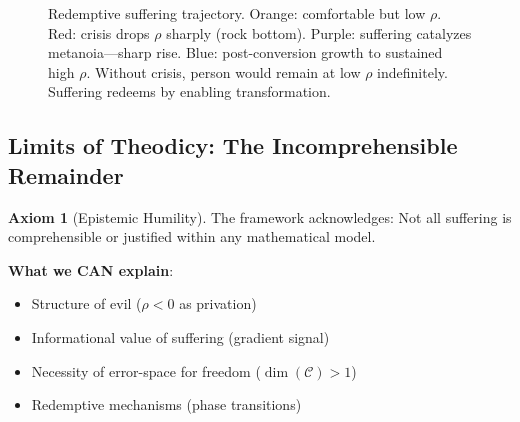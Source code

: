 \documentclass[11pt,a4paper]{article}
\theoremstyle{definition}
\newtheorem{axiom}{Axiom}[section]
\theoremstyle{remark}
\newcommand{\CC}{\mathcal{C}}
\begin{document}
\begin{small}
\begin{enumerate}
\begin{figure}[H]
\caption{Redemptive suffering trajectory. Orange: comfortable but low \(\rho\). Red: crisis drops \(\rho\) sharply (rock bottom). Purple: suffering catalyzes metanoia—sharp rise. Blue: post-conversion growth to sustained high \(\rho\). Without crisis, person would remain at low \(\rho\) indefinitely. Suffering redeems by enabling transformation.}
\label{fig:redemptive_suffering}
\end{figure}

\subsection{Limits of Theodicy: The Incomprehensible Remainder}

\begin{axiom}[Epistemic Humility]
The framework acknowledges: Not all suffering is comprehensible or justified within any mathematical model.

\textbf{What we CAN explain}:
\begin{itemize}
    \item Structure of evil (\(\rho < 0\) as privation)
    \item Informational value of suffering (gradient signal)
    \item Necessity of error-space for freedom (\(\dim(\CC) > 1\))
    \item Redemptive mechanisms (phase transitions)
\end{itemize}


\end{axiom}
\end{enumerate}
\end{small}
\end{document}
